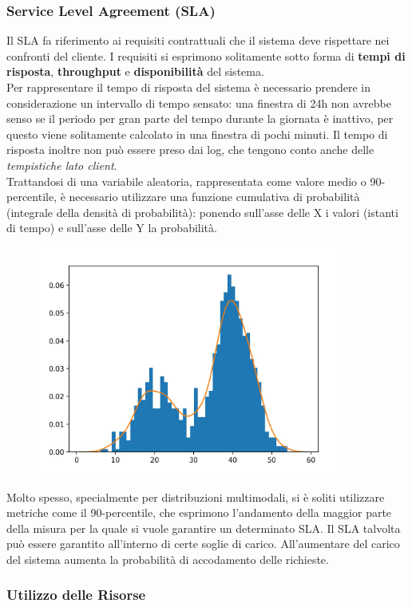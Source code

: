 \documentclass{article}
\begin{document}
		\subsubsection{Service Level Agreement (SLA)}\label{service-level-agreement-sla}
		
		Il SLA fa riferimento ai requisiti contrattuali che il sistema deve rispettare nei confronti del cliente. I requisiti si esprimono solitamente sotto forma di \textbf{tempi di risposta}, \textbf{throughput} e \textbf{disponibilità} del sistema.\\
		Per rappresentare il tempo di risposta del sistema è necessario prendere in	considerazione un intervallo di tempo sensato: una finestra di	24h non avrebbe senso se il periodo per gran parte del tempo durante la giornata è inattivo, per questo viene solitamente calcolato in una finestra di pochi minuti. Il tempo di risposta inoltre non può	essere preso dai log, che tengono conto anche delle \emph{tempistiche	lato client}.\\
		Trattandosi di una variabile aleatoria,	rappresentata come valore medio o 90-percentile, è necessario utilizzare una funzione cumulativa di probabilità (integrale della densità di probabilità): ponendo sull'asse delle X i valori (istanti di tempo) e sull'asse delle Y la probabilità.
		
		\begin{figure}[ht]
			\centering
			\includegraphics[width=0.5\linewidth]{SAC_B8_sla}
			\label{fig:sacb8sla}
		\end{figure}
		
		Molto spesso, specialmente per distribuzioni multimodali, si è soliti utilizzare metriche come il 90-percentile, che esprimono l’andamento della maggior parte della misura per la quale si vuole garantire un determinato SLA. Il SLA talvolta può essere garantito all'interno di certe soglie di carico. All'aumentare del carico del sistema aumenta la probabilità di accodamento delle richieste.
		
		\subsubsection{Utilizzo delle Risorse}\label{utilizzo-delle-risorse}
\end{document}
